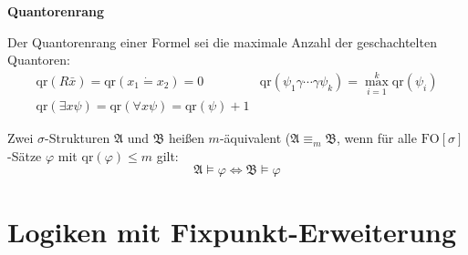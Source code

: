 \begin{defn}
\textbf{\label{def:qr}Quantorenrang}

Der Quantorenrang einer Formel sei die maximale Anzahl der geschachtelten
Quantoren:
\[
\begin{array}{cc}
\mathrm{qr}\left(R\bar{x}\right)=\mathrm{qr}\left(x_{1}\dot{=}x_{2}\right)=0 & \mathrm{qr}\left(\psi_{1}\gamma\cdots\gamma\psi_{k}\right)=\max_{i=1}^{k}\mathrm{qr}\left(\psi_{i}\right)\\
\mathrm{qr}\left(\exists x\psi\right)=\mathrm{qr}\left(\forall x\psi\right)=\mathrm{qr}\left(\psi\right)+1
\end{array}
\]
\end{defn}
%
\begin{defn}
\label{def:m-equiv}Zwei $\sigma$-Strukturen $\mathfrak{A}$ und
$\mathfrak{B}$ heißen $m$-äquivalent ($\mathfrak{A}\equiv_{m}\mathfrak{B}$,
wenn für alle $\mathrm{FO}\left[\sigma\right]$-Sätze $\varphi$ mit
$\mathrm{qr}\left(\varphi\right)\leqslant m$ gilt:
\[
\mathfrak{A}\models\varphi\Longleftrightarrow\mathfrak{B}\models\varphi
\]
\end{defn}

\section{Logiken mit Fixpunkt-Erweiterung}

